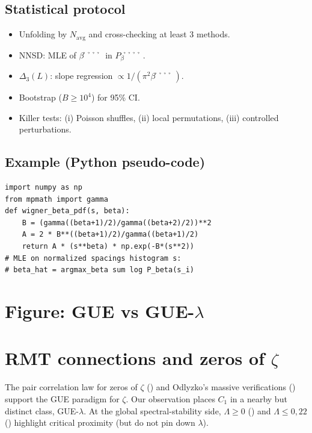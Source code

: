 \documentclass[11pt,a4paper]{article}
\def\lambda{λ}%
\def\Delta{Δ}%
\def\beta{β̉̉̉̉}%
\def\zeta{ζ}%
\def\textbf#1{#1}%
\def\emph#1{#1}%
\begin{document}
\subsection*{Statistical protocol}
\begin{itemize}
  \item \textbf{Unfolding} by $N_{\text{avg}}$ and cross-checking at least 3 methods.
  \item \textbf{NNSD}: MLE of $\beta$ in $P_\beta$.
  \item \textbf{$\Delta_3(L)$}: slope regression $\propto 1/(\pi^2\beta)$.
  \item \textbf{Bootstrap} ($B\ge 10^4$) for 95\% CI.
  \item \textbf{Killer tests}: (i) Poisson shuffles, (ii) local permutations, (iii) controlled perturbations.
\end{itemize}

\subsection*{Example (Python pseudo-code)}
\begin{verbatim}
import numpy as np
from mpmath import gamma
def wigner_beta_pdf(s, beta):
    B = (gamma((beta+1)/2)/gamma((beta+2)/2))**2
    A = 2 * B**((beta+1)/2)/gamma((beta+1)/2)
    return A * (s**beta) * np.exp(-B*(s**2))
# MLE on normalized spacings histogram s:
# beta_hat = argmax_beta sum log P_beta(s_i)
\end{verbatim}

\section{Figure: GUE vs GUE-\texorpdfstring{$\lambda$}{lambda}}

\section{RMT connections and zeros of \texorpdfstring{$\zeta$}{zeta}}
The pair correlation law for zeros of $\zeta$ (\citealt{Montgomery1973}) and Odlyzko’s massive verifications (\citealt{Odlyzko1987}) support the GUE paradigm for $\zeta$.
Our observation places $C_1$ in a \emph{nearby} but distinct class, GUE-$\lambda$.
At the global spectral-stability side, $\Lambda\ge 0$ (\citealt{RodgersTao2018}) and $\Lambda\le 0{,}22$ (\citealt{Polymath2019}) highlight \emph{critical proximity} (but do not pin down $\lambda$).
\end{document}
